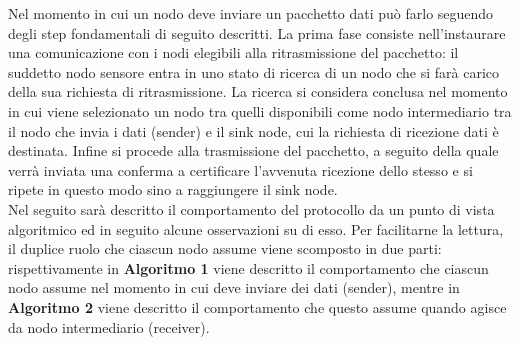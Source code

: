 \documentclass[binding=0.6cm,TFA]{sapthesis}
\begin{document}
Nel momento in cui un nodo deve inviare un pacchetto dati può farlo seguendo degli step fondamentali di seguito descritti.
La prima fase consiste nell'instaurare una comunicazione con i nodi elegibili alla ritrasmissione del pacchetto: il suddetto nodo sensore
entra in uno stato di ricerca di un nodo che si farà carico della sua richiesta di ritrasmissione. La ricerca si considera conclusa
nel momento in cui viene selezionato un nodo tra quelli disponibili come nodo intermediario tra il nodo che invia i dati (sender) e il sink
node, cui la richiesta di ricezione dati è destinata. Infine si procede alla trasmissione del pacchetto, a seguito della quale
verrà inviata una conferma a certificare l'avvenuta ricezione dello stesso e si ripete in questo modo sino a raggiungere
il sink node.\\

Nel seguito sarà descritto il comportamento del protocollo da un punto di vista algoritmico ed in seguito alcune osservazioni su di esso.
Per facilitarne la lettura, il duplice ruolo che ciascun nodo assume viene scomposto in due parti: rispettivamente in \textbf{Algoritmo 1}
viene descritto il comportamento che ciascun nodo assume nel momento in cui deve inviare dei dati (sender), mentre in \textbf{Algoritmo 2}
viene descritto il comportamento che questo assume quando agisce da nodo intermediario (receiver).
\end{document}
